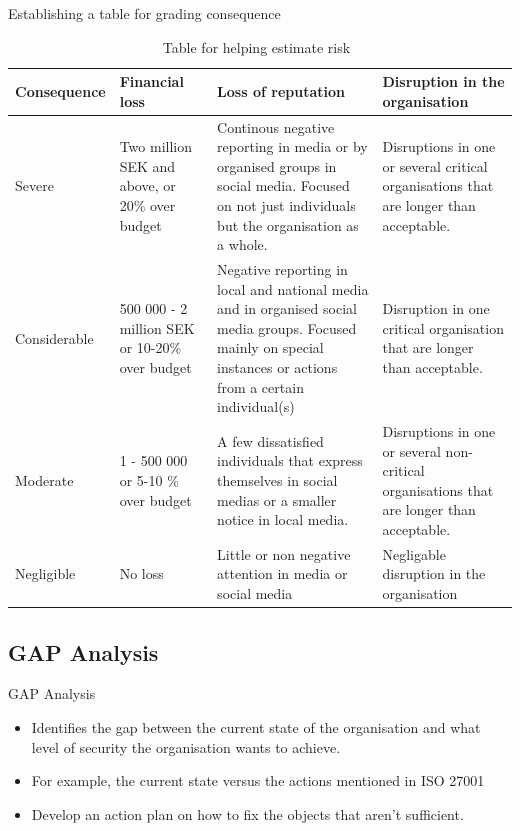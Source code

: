 \documentclass{beamer}
\begin{document}
\begin{frame}{Establishing a table for grading consequence}
  \begin{table}
    \tiny
    \caption{Table for helping estimate risk~\cite{msb_metodstod}}
    \begin{tabularx}{\textwidth}{X | X | X | X}
    Consequence & Financial loss & Loss of reputation & Disruption in the
    organisation\\ 
    \toprule

    Severe & Two million SEK and above, or 20\% over budget & Continous negative
    reporting in media or by organised groups in social media. Focused on not
    just individuals but the organisation as a whole.& Disruptions in one or
    several critical organisations that are longer than acceptable.\\

    \midrule
    Considerable & 500 000 - 2 million SEK or 10-20\% over budget & Negative
    reporting in local and national media and in organised social media groups.
    Focused mainly on special instances or actions from a certain individual(s)
    & Disruption in one critical organisation that are longer than acceptable.
    \\ 
    \midrule
    Moderate & 1 - 500 000 or 5-10 \% over budget & A few dissatisfied
    individuals that express themselves in social medias or a smaller notice in
    local media.& Disruptions in one or several non-critical organisations that
    are longer than acceptable.\\ 
    \midrule
    Negligible & No loss & Little or non negative attention in media or social
    media & Negligable disruption in the organisation\\ 
    \bottomrule
  \end{tabularx}
  \end{table}
\end{frame}

\subsection{GAP Analysis}
\begin{frame}{GAP Analysis}
  \begin{itemize}
    \item Identifies the gap between the current state of the organisation and
      what level of security the organisation wants to achieve.
    \item For example, the current state versus the actions mentioned in ISO
      27001~\cite[Bilaga A]{iso27001}
    \item Develop an action plan on how to fix the objects that aren't 
      sufficient.
  \end{itemize}
\end{frame}
\end{document}

